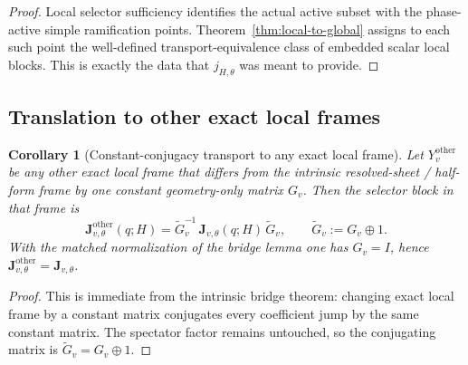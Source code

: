 \documentclass[11pt]{article}
\numberwithin{equation}{section}
\newtheorem{corollary}[theorem]{Corollary}
\theoremstyle{definition}
\newcommand{\Jemb}{\mathbf J_{v,\theta}}
\begin{document}
\begin{proof}
Local selector sufficiency identifies the actual active subset with the phase-active simple ramification points. Theorem~\ref{thm:local-to-global} assigns to each such point the well-defined transport-equivalence class of embedded scalar local blocks. This is exactly the data that $j_{H,\theta}$ was meant to provide.
\end{proof}

\subsection{Translation to other exact local frames}

\begin{corollary}[Constant-conjugacy transport to any exact local frame]
\label{cor:constant-conjugacy}
Let $Y^{\mathrm{other}}_v$ be any other exact local frame that differs from the intrinsic resolved-sheet / half-form frame by one constant geometry-only matrix $G_v$. Then the selector block in that frame is
\begin{equation}
\label{eq:other-frame}
\Jemb^{\mathrm{other}}(q;H)=\widetilde G_v^{-1}\,\Jemb(q;H)\,\widetilde G_v,
\qquad
\widetilde G_v:=G_v\oplus 1.
\end{equation}
With the matched normalization of the bridge lemma one has $G_v=I$, hence $\Jemb^{\mathrm{other}}=\Jemb$.
\end{corollary}

\begin{proof}
This is immediate from the intrinsic bridge theorem: changing exact local frame by a constant matrix conjugates every coefficient jump by the same constant matrix. The spectator factor remains untouched, so the conjugating matrix is $\widetilde G_v=G_v\oplus 1$.
\end{proof}
\end{document}
